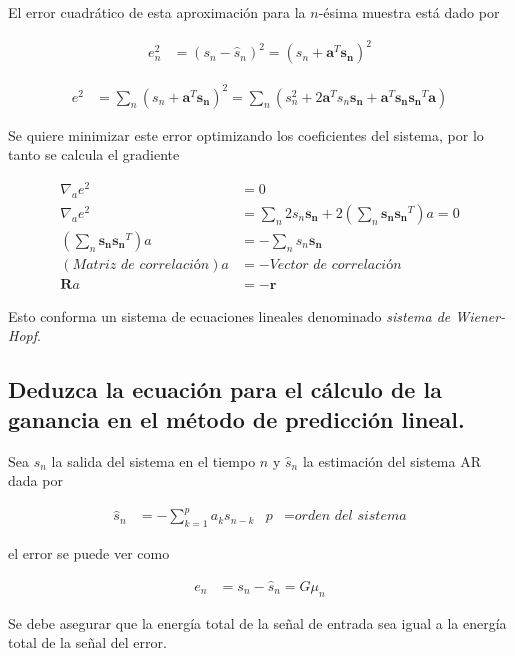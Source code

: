 \documentclass[a4paper,10pt,spanish,oneside]{article}
\begin{document}
El error cuadrático de esta aproximación para la $n$-ésima muestra está dado por

\begin{align*}
e_{n}^{2} &= (s_{n}-\hat{s}_{n})^{2}=(s_{n}+\mathbf{a}^{T}\mathbf{s_{n}})^{2}
\end{align*}

\begin{align*}
e^{2} &= \sum_{n}(s_{n}+\mathbf{a}^{T}\mathbf{s_{n}})^{2}
=\sum_{n}(s_{n}^{2}+2\mathbf{a}^{T}s_{n}\mathbf{s_{n}}
+\mathbf{a}^{T}\mathbf{s_{n}}\mathbf{s_{n}}^{T}\mathbf{a})
\end{align*}

Se quiere minimizar este error optimizando los coeficientes del sistema, por lo tanto se calcula el gradiente

\begin{align*}
\nabla_{a}e^{2} &= 0 \\
\nabla_{a}e^{2} &= \sum_{n}2s_{n}\mathbf{s_{n}}
+2\left(\sum_{n}\mathbf{s_{n}}\mathbf{s_{n}}^{T}\right)a=0 \\
\left(\sum_{n}\mathbf{s_{n}}\mathbf{s_{n}}^{T}\right)a &= -\sum_{n}s_{n}\mathbf{s_{n}} \\
(\textit{Matriz de correlación})a &= -\textit{Vector de correlación} \\
\mathbf{R}a &= -\mathbf{r}
\end{align*}

Esto conforma un sistema de ecuaciones lineales denominado \textit{sistema de Wiener-Hopf}.

\subsection{Deduzca la ecuación para el cálculo de la ganancia en el método de predicción lineal.}

Sea $s_{n}$ la salida del sistema en el tiempo $n$ y $\hat{s}_{n}$ la estimación del sistema AR dada por

\begin{align*}
\hat{s}_{n} &= -\sum_{k=1}^{p}a_{k}s_{n-k} & p &= \textit{orden del sistema}
\end{align*}

el error se puede ver como

\begin{align*}
e_{n} &= s_{n}-\hat{s}_{n}=G\mu_{n} 
\end{align*}

Se debe asegurar que la energía total de la señal de entrada sea igual a la energía total de la señal del error.
\end{document}
